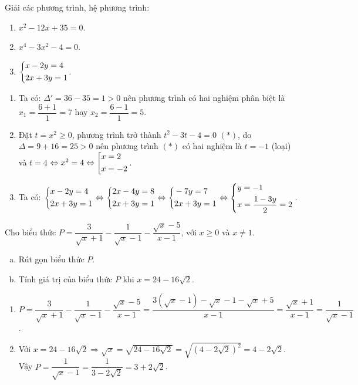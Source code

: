 \begin{ex}%
Giải các phương trình, hệ phương trình: 
    \begin{multicols}{2}
    \begin{enumerate}    
    	\item $x^2-12x+35=0$.
    	\item $x^4-3x^2-4=0$.
    	\item $\left\{\begin{aligned}&x-2y=4\\&2x+3y=1\end{aligned}\right.$.
    \end{enumerate}
    \end{multicols}
    \loigiai
    {    \begin{enumerate}
        \item Ta có: $\Delta'=36-35=1>0$ nên phương trình có hai nghiệm phân biệt là $x_1=\dfrac{6+1}{1}=7$ hay $x_2=\dfrac{6-1}{1}=5$.
        \item Đặt $t=x^2\ge0$, phương trình trở thành $t^2-3t-4=0$ $(*)$, do $\Delta=9+16=25>0$ nên phương trình $(*)$ có hai nghiệm là $t=-1$ (loại) và $t=4$ $\Leftrightarrow x^2=4\Leftrightarrow\left[\begin{aligned}&x=2\\&x=-2\end{aligned}\right.$.
        \item Ta có: $\left\{\begin{aligned}&x-2y=4\\&2x+3y=1\end{aligned}\right.\Leftrightarrow\left\{\begin{aligned}&2x-4y=8\\&2x+3y=1\end{aligned}\right.\Leftrightarrow\left\{\begin{aligned}&-7y=7\\&2x+3y=1\end{aligned}\right.\Leftrightarrow\left\{\begin{aligned}&y=-1\\&x=\dfrac{1-3y}{2}=2\end{aligned}\right.$.
    \end{enumerate}}
\end{ex}

\begin{ex}%
    Cho biểu thức $P=\dfrac{3}{\sqrt{x}+1}-\dfrac{1}{\sqrt{x}-1}-\dfrac{\sqrt{x}-5}{x-1}$, với $x\ge0$ và $x\ne1$.
    \begin{enumerate}[a)]
        \item Rút gọn biểu thức $P$.
        \item Tính giá trị của biểu thức $P$ khi $x=24-16\sqrt{2}$.
    \end{enumerate}
\loigiai
    {
    \begin{enumerate}
        \item $P=\dfrac{3}{\sqrt{x}+1}-\dfrac{1}{\sqrt{x}-1}-\dfrac{\sqrt{x}-5}{x-1}=\dfrac{3(\sqrt{x}-1)-\sqrt{x}-1-\sqrt{x}+5}{x-1}=\dfrac{\sqrt{x}+1}{x-1}=\dfrac{1}{\sqrt{x}-1}$.
        \item Với $x=24-16\sqrt{2}\Rightarrow\sqrt{x}=\sqrt{24-16\sqrt{2}}=\sqrt{(4-2\sqrt{2})^2}=4-2\sqrt{2}$.\\
        Vậy $P=\dfrac{1}{\sqrt{x}-1}=\dfrac{1}{3-2\sqrt{2}}=3+2\sqrt{2}$.
    \end{enumerate}
    }
\end{ex}


